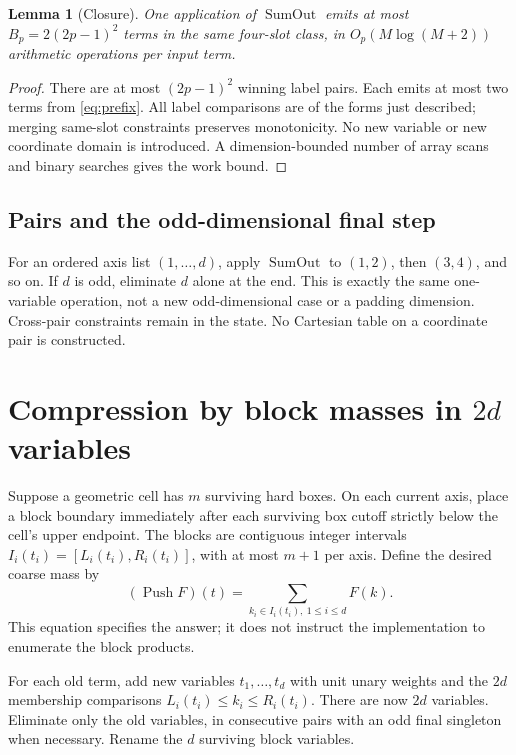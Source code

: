\documentclass[12pt,a4paper]{article}
\newtheorem{lemma}[theorem]{Lemma}
\newcommand{\1}{\mathbf1}
\newcommand{\SumOut}{\operatorname{SumOut}}
\newcommand{\Push}{\operatorname{Push}}
\begin{document}
\begin{lemma}[Closure]
One application of $\SumOut$ emits at most
$B_p=2(2p-1)^2$ terms in the same four-slot class, in
$O_p(M\log(M+2))$ arithmetic operations per input term.
\end{lemma}
\begin{proof}
There are at most $(2p-1)^2$ winning label pairs. Each emits at most two
terms from \eqref{eq:prefix}. All label comparisons are of the forms just
described; merging same-slot constraints preserves monotonicity. No new
variable or new coordinate domain is introduced. A dimension-bounded
number of array scans and binary searches gives the work bound.
\end{proof}

\subsection{Pairs and the odd-dimensional final step}
For an ordered axis list $(1,\ldots,d)$, apply $\SumOut$ to $(1,2)$,
then $(3,4)$, and so on. If $d$ is odd, eliminate $d$ alone at the end.
This is exactly the same one-variable operation, not a new odd-dimensional
case or a padding dimension. Cross-pair constraints remain in the state.
No Cartesian table on a coordinate pair is constructed.

\section{Compression by block masses in $2d$ variables}\label{sec:push}
Suppose a geometric cell has $m$ surviving hard boxes. On each current
axis, place a block boundary immediately after each surviving box cutoff
strictly below the cell's upper endpoint. The blocks are contiguous integer
intervals $I_i(t_i)=[L_i(t_i),R_i(t_i)]$, with at most $m+1$ per axis.
Define the desired coarse mass by
\begin{equation}
        (\Push F)(t)=\sum_{k_i\in I_i(t_i),\ 1\le i\le d}F(k).
                                                        \label{eq:push}
\end{equation}
This equation specifies the answer; it does not instruct the implementation
to enumerate the block products.

For each old term, add new variables $t_1,\ldots,t_d$ with unit unary
weights and the $2d$ membership comparisons
$L_i(t_i)\le k_i\le R_i(t_i)$. There are now $2d$ variables.
Eliminate only the old variables, in consecutive pairs with an odd final
singleton when necessary. Rename the $d$ surviving block variables.
\end{document}
